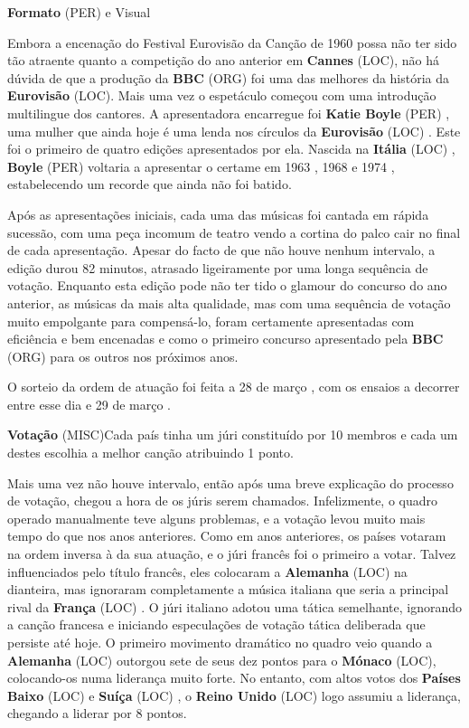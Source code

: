 \documentclass[12pt,a4paper]{article}
\begin{document}
\textbf{Formato} (PER) e Visual

Embora a encenação do Festival Eurovisão da Canção de 1960 possa não ter sido tão atraente quanto a competição do ano anterior em \textbf{Cannes} (LOC), não há dúvida de que a produção da \textbf{BBC} (ORG) foi uma das melhores da história da \textbf{Eurovisão} (LOC). Mais uma vez o espetáculo começou com uma introdução multilingue dos cantores. A apresentadora encarregue foi \textbf{Katie Boyle} (PER) , uma mulher que ainda hoje é uma lenda nos círculos da \textbf{Eurovisão} (LOC) . Este foi o primeiro de quatro edições apresentados por ela. Nascida na \textbf{Itália} (LOC) , \textbf{Boyle} (PER) voltaria a apresentar o certame em 1963 , 1968 e 1974 , estabelecendo um recorde que ainda não foi batido.

Após as apresentações iniciais, cada uma das músicas foi cantada em rápida sucessão, com uma peça incomum de teatro vendo a cortina do palco cair no final de cada apresentação. Apesar do facto de que não houve nenhum intervalo, a edição durou 82 minutos, atrasado ligeiramente por uma longa sequência de votação. Enquanto esta edição pode não ter tido o glamour do concurso do ano anterior, as músicas da mais alta qualidade, mas com uma sequência de votação muito empolgante para compensá-lo, foram certamente apresentadas com eficiência e bem encenadas e como o primeiro concurso apresentado pela \textbf{BBC} (ORG) para os outros nos próximos anos.

O sorteio da ordem de atuação foi feita a 28 de março , com os ensaios a decorrer entre esse dia e 29 de março .



\textbf{Votação} (MISC)Cada país tinha um júri constituído por 10 membros e cada um destes escolhia a melhor canção atribuindo 1 ponto.

Mais uma vez não houve intervalo, então após uma breve explicação do processo de votação, chegou a hora de os júris serem chamados. Infelizmente, o quadro operado manualmente teve alguns problemas, e a votação levou muito mais tempo do que nos anos anteriores. Como em anos anteriores, os países votaram na ordem inversa à da sua atuação, e o júri francês foi o primeiro a votar. Talvez influenciados pelo título francês, eles colocaram a \textbf{Alemanha} (LOC) na dianteira, mas ignoraram completamente a música italiana que seria a principal rival da \textbf{França} (LOC) . O júri italiano adotou uma tática semelhante, ignorando a canção francesa e iniciando especulações de votação tática deliberada que persiste até hoje. O primeiro movimento dramático no quadro veio quando a \textbf{Alemanha} (LOC) outorgou sete de seus dez pontos para o \textbf{Mónaco} (LOC), colocando-os numa liderança muito forte. No entanto, com altos votos dos \textbf{Países Baixo} (LOC) e \textbf{Suíça} (LOC) , o \textbf{Reino Unido} (LOC) logo assumiu a liderança, chegando a liderar por 8 pontos.
\end{document}
